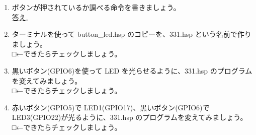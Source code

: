 \begin{tcolorbox}[title=\useOmetoi]
\begin{enumerate}
\item ボタンが押されているか調べる命令を書きましょう。\\
\underline{答え.\hspace{0.8\linewidth}}
\item ターミナルを使って button\_led.hsp のコピーを、331.hsp という名前で作りましょう。\\
□←できたらチェックしましょう。
\item 黒いボタン(GPIO6)を使って LED を光らせるように、331.hsp のプログラムを変えてみましょう。\\
□←できたらチェックしましょう。
\item  赤いボタン(GPIO5)で LED1(GPIO17)、黒いボタン(GPIO6)で LED3(GPIO22)が光るように、331.hsp のプログラムを変えてみましょう。\\
□←できたらチェックしましょう。
\end{enumerate}
\end{tcolorbox}